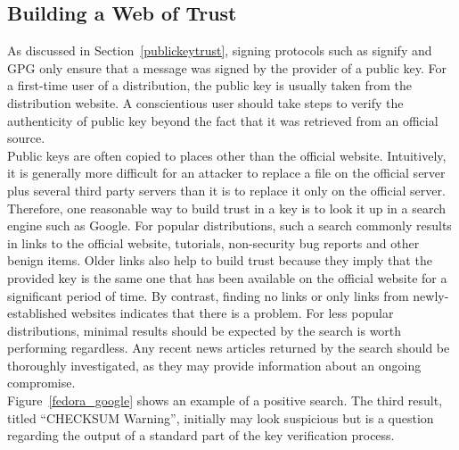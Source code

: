 \documentclass[conference]{IEEEtran}
\begin{document}
\subsection{Building a Web of Trust}

As discussed in Section~\ref{publickeytrust}, signing protocols such as signify and GPG only
ensure that a message was signed by the provider of a public key. For a first-time user
of a distribution, the public key is usually taken from the distribution website.
A conscientious user should take steps to verify the authenticity of public key beyond the
fact that it was retrieved from an official source.\\
\indent Public keys are often copied to places
other than the official website. Intuitively, it is generally more difficult for an attacker
to replace a file on the official server plus several third party servers than it is to
replace it only on the official server. Therefore, one reasonable way to build trust in a
key is to look it up in a search engine such as Google. For popular distributions, such
a search commonly results in links to the official website, tutorials, non-security bug
reports and other benign items. Older links also help to build trust because they imply
that the provided key is the same one that has been available on the official website for
a significant period of time. By contrast, finding no links or only links from newly-
established websites indicates that there is a problem. For less popular distributions,
minimal results should be expected by the search is worth performing regardless. Any recent
news articles returned
by the search should be thoroughly investigated, as they may provide information about an
ongoing compromise.\\
\indent Figure~\ref{fedora_google} shows an example of a positive search. The
third result, titled ``CHECKSUM Warning'', initially may look suspicious but is a question
regarding the output of a standard part of the key verification process.
\end{document}
